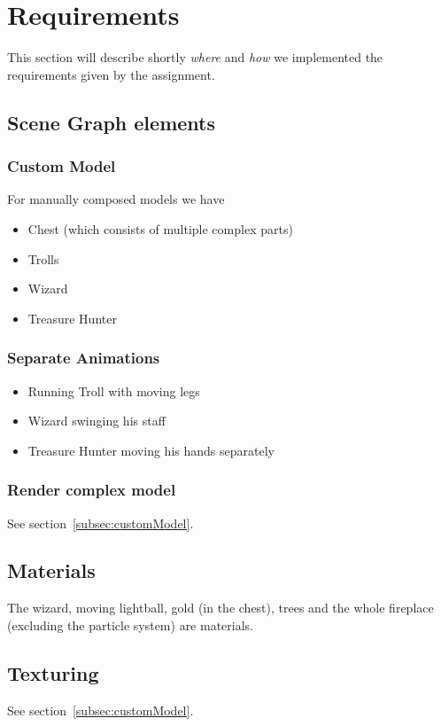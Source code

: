 \section{Requirements} \label{sec:requirements}
This section will describe shortly \emph{where} and \emph{how} we implemented the requirements given by the assignment.

\subsection{Scene Graph elements} \label{subsec:sceneGraph}
\subsubsection*{Custom Model}
For manually composed models we have
\begin{itemize}
	\item Chest (which consists of multiple complex parts)
	\item Trolls
	\item Wizard
	\item Treasure Hunter
\end{itemize}

\subsubsection*{Separate Animations}
\begin{itemize}
	\item Running Troll with moving legs
	\item Wizard swinging his staff
	\item Treasure Hunter moving his hands separately
\end{itemize}
\subsubsection*{Render complex model}
See section~\ref{subsec:customModel}.

\subsection{Materials} \label{sec:Materials}
The wizard, moving lightball, gold (in the chest), trees and the whole fireplace (excluding the particle system) are materials.

\subsection{Texturing} \label{Texturing}
See section~\ref{subsec:customModel}.

